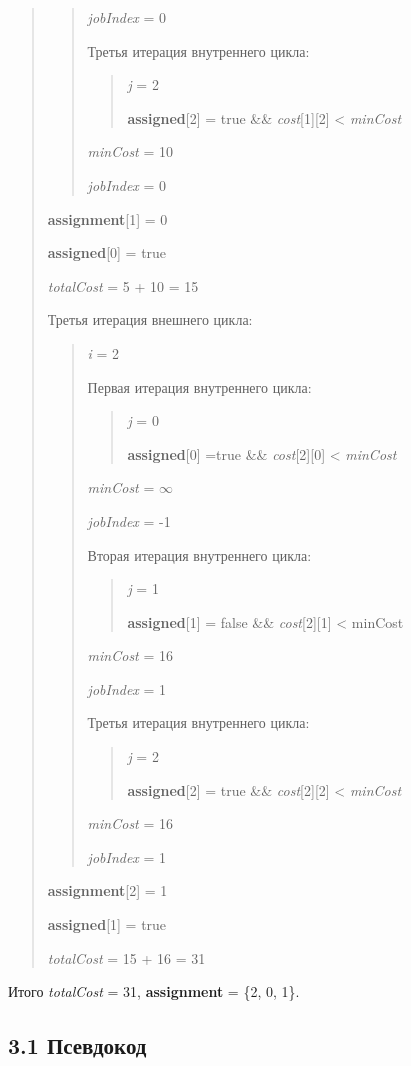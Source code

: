 \documentclass[]{article}
\begin{document}
\begin{quote}
\begin{quote}
\emph{jobIndex} = 0

Третья итерация внутреннего цикла:
\begin{quote}
\emph{j} = 2


\textbf{assigned}{[}2{]} = true \&\& \emph{cost}{[}1{]}{[}2{]}
\textless{} \emph{minCost}
\end{quote}
\emph{minCost} = 10

\emph{jobIndex} = 0
\end{quote}
\textbf{assignment}{[}1{]} = 0

\textbf{assigned}{[}0{]} = true

\emph{totalCost} = 5 + 10 = 15

Третья итерация внешнего цикла:
\begin{quote}
\emph{i} = 2

Первая итерация внутреннего цикла:
\begin{quote}
\emph{j} = 0

\textbf{assigned}{[}0{]} =true \&\& \emph{cost}{[}2{]}{[}0{]}
\textless{} \emph{minCost}
\end{quote}
\emph{minCost} = {$\infty$}

\emph{jobIndex} = -1

Вторая итерация внутреннего цикла:
\begin{quote}
\emph{j} = 1


\textbf{assigned}{[}1{]} = false \&\& \emph{cost}{[}2{]}{[}1{]}
\textless{} minCost
\end{quote}
\emph{minCost} = 16

\emph{jobIndex} = 1

Третья итерация внутреннего цикла:

\begin{quote}
\emph{j} = 2


\textbf{assigned}{[}2{]} = true \&\& \emph{cost}{[}2{]}{[}2{]}
\textless{} \emph{minCost}
\end{quote}
\emph{minCost} = 16

\emph{jobIndex} = 1
\end{quote}
\textbf{assignment}{[}2{]} = 1

\textbf{assigned}{[}1{]} = true

\emph{totalCost} = 15 + 16 = 31
\end{quote}
Итого \emph{totalCost} = 31, \textbf{assignment} = \{2, 0, 1\}.

\hypertarget{Псевдокод}{%
\subsection{3.1
Псевдокод}\label{псевдокод}}
\end{document}
